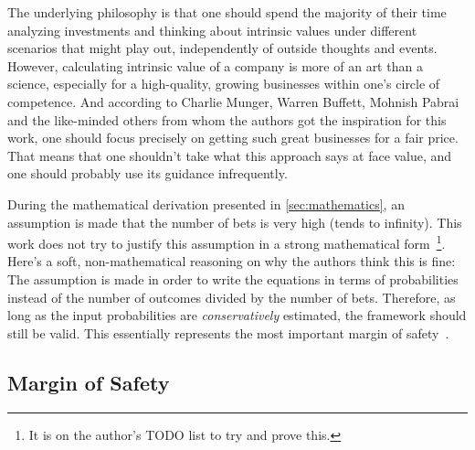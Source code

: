 \documentclass{article}
\begin{document}
The underlying philosophy is that one should spend the majority of their time
analyzing investments and thinking about intrinsic values under different
scenarios that might play out, independently of outside thoughts and events.
However, calculating intrinsic value of a company is more of an art than a
science, especially for a high-quality, growing businesses within one's circle
of competence. And according to Charlie Munger, Warren Buffett, Mohnish Pabrai
and the like-minded others from whom the authors got the inspiration for this
work, one should focus precisely on getting such great businesses for a fair
price. That means that one shouldn't take what this approach says at face value,
and one should probably use its guidance infrequently.

During the mathematical derivation presented in \autoref{sec:mathematics}, an
assumption is made that the number of bets is very high (tends to infinity).
This work does not try to justify this assumption in a strong mathematical
form~\footnote{It is on the author's TODO list to try and prove this.}. Here's a
soft, non-mathematical reasoning on why the authors think this is fine: The
assumption is made in order to write the equations in terms of probabilities
instead of the number of outcomes divided by the number of bets. Therefore, as
long as the input probabilities are \textit{conservatively} estimated, the
framework should still be valid. This essentially represents the most important
margin of safety~\cite{intelligentInvestor}.

\subsection{Margin of Safety}
\label{sec:safetyMargin}
\end{document}
